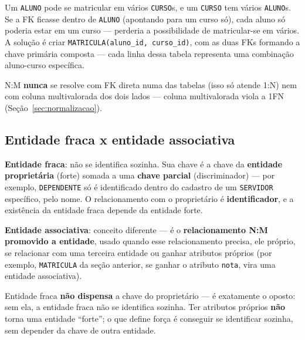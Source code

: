 \begin{exemplo}
Um \texttt{ALUNO} pode se matricular em vários \texttt{CURSO}s, e um
\texttt{CURSO} tem vários \texttt{ALUNO}s. Se a FK ficasse dentro de
\texttt{ALUNO} (apontando para um curso só), cada aluno só poderia estar
em um curso --- perderia a possibilidade de matricular-se em vários. A
solução é criar \texttt{MATRICULA(aluno\_id, curso\_id)}, com as duas FKs
formando a chave primária composta --- cada linha dessa tabela representa
uma combinação aluno-curso específica.
\end{exemplo}

\begin{cuidado}
N:M \textbf{nunca} se resolve com FK direta numa das tabelas (isso só
atende 1:N) nem com coluna multivalorada dos dois lados --- coluna
multivalorada viola a 1FN (Seção~\ref{sec:normalizacao}).
\end{cuidado}

\subsection{Entidade fraca x entidade associativa}

\begin{conceito}
\textbf{Entidade fraca}: não se identifica sozinha. Sua chave é a chave da
\textbf{entidade proprietária} (forte) somada a uma \textbf{chave parcial}
(discriminador) --- por exemplo, \texttt{DEPENDENTE} só é identificado
dentro do cadastro de um \texttt{SERVIDOR} específico, pelo nome. O
relacionamento com o proprietário é \textbf{identificador}, e a existência
da entidade fraca depende da entidade forte.

\textbf{Entidade associativa}: conceito diferente --- é o
\textbf{relacionamento N:M promovido a entidade}, usado quando esse
relacionamento precisa, ele próprio, se relacionar com uma terceira
entidade ou ganhar atributos próprios (por exemplo, \texttt{MATRICULA} da
seção anterior, se ganhar o atributo \texttt{nota}, vira uma entidade
associativa).
\end{conceito}

\begin{cuidado}
Entidade fraca \textbf{não dispensa} a chave do proprietário --- é
exatamente o oposto: sem ela, a entidade fraca não se identifica sozinha.
Ter atributos próprios \textbf{não} torna uma entidade “forte”; o que
define força é conseguir se identificar sozinha, sem depender da chave de
outra entidade.
\end{cuidado}


